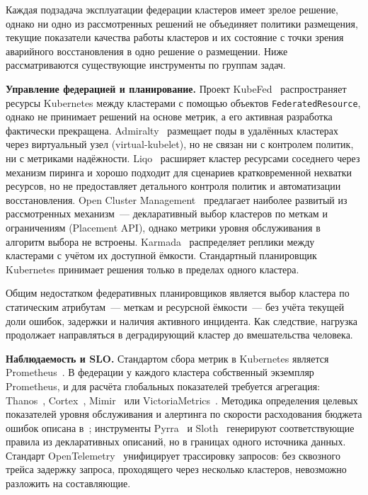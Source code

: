 
Каждая подзадача эксплуатации федерации кластеров имеет зрелое решение,
однако ни одно из рассмотренных решений не объединяет политики размещения,
текущие показатели качества работы кластеров и их состояние с точки зрения
аварийного восстановления в одно решение о размещении. Ниже рассматриваются
существующие инструменты по группам задач.

\textbf{Управление федерацией и планирование.} Проект KubeFed~\cite{kubefed}
распространяет ресурсы Kubernetes между кластерами с помощью объектов
\texttt{FederatedResource}, однако не принимает решений на основе метрик, а
его активная разработка фактически прекращена. Admiralty~\cite{admiralty}
размещает поды в удалённых кластерах через виртуальный узел (virtual-kubelet),
но не связан ни с контролем политик, ни с метриками надёжности.
Liqo~\cite{liqo} расширяет кластер ресурсами соседнего через механизм
пиринга и хорошо подходит для сценариев кратковременной нехватки ресурсов, но
не предоставляет детального контроля политик и автоматизации восстановления.
Open Cluster Management~\cite{ocm} предлагает наиболее развитый из
рассмотренных механизм~--- декларативный выбор кластеров по меткам и
ограничениям (Placement API), однако метрики уровня обслуживания в алгоритм
выбора не встроены. Karmada~\cite{karmada} распределяет реплики между
кластерами с учётом их доступной ёмкости. Стандартный планировщик
Kubernetes принимает решения только в пределах одного кластера.

Общим недостатком федеративных планировщиков является выбор кластера по
статическим атрибутам~--- меткам и ресурсной ёмкости~--- без учёта текущей
доли ошибок, задержки и наличия активного инцидента. Как следствие, нагрузка
продолжает направляться в деградирующий кластер до вмешательства человека.

\textbf{Наблюдаемость и SLO.} Стандартом сбора метрик в Kubernetes является
Prometheus~\cite{prometheus}. В федерации у каждого кластера собственный
экземпляр Prometheus, и для расчёта глобальных показателей требуется
агрегация: Thanos~\cite{thanos}, Cortex~\cite{cortex}, Mimir~\cite{mimir} или
VictoriaMetrics~\cite{victoriametrics}. Методика определения целевых
показателей уровня обслуживания и алертинга по скорости расходования бюджета
ошибок описана в~\cite{sre-book, sre-workbook}; инструменты Pyrra~\cite{pyrra}
и Sloth~\cite{sloth} генерируют соответствующие правила из декларативных
описаний, но в границах одного источника данных. Стандарт
OpenTelemetry~\cite{otel} унифицирует трассировку запросов: без сквозного
трейса задержку запроса, проходящего через несколько кластеров, невозможно
разложить на составляющие.

